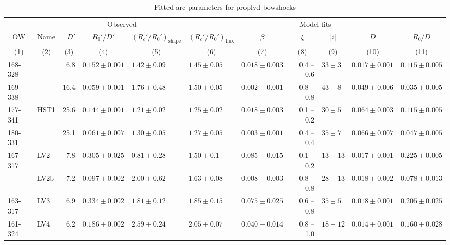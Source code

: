 \begin{table}
  \caption{Fitted arc parameters for proplyd bowshocks}
  \label{tab:arc-fits} 
\newcommand\C[1]{\multicolumn{1}{c}{#1}}
\begin{tabular}{llrllllrlll}\toprule
             &          & \multicolumn{3}{c}{\dotfill Observed \dotfill}              & \multicolumn{6}{c}{\dotfill Model fits \dotfill} \\ 
  \C{OW}     & \C{Name} & \(D'\) &\C{ \(R_0'/D'\) }&\C{ \((R_c'/R_0')_{\mathrm{shape}}\) }&\C{ \((R_c'/R_0')_{\mathrm{flux}}\) }&\C{ \(\beta\) }&\C{ \(\xi\) }&\C{ \(|i|\) }&\C{ \(D\) }&\C{ \(R_0/D\)}\\
  \C{(1)}& \C{ (2) }&\C{ (3)    }&\C{    (4)      }&\C{              (5)           }&\C{           (6)             }&\C{     (7)   }&\C{   (8)   }&\C{   (9) }&\C{  (10) }&\C{   (11)} \\
\midrule     
 168-328  &            &    6.8  &  $0.152 \pm 0.001$  &  $1.42 \pm 0.09$   &  $1.45 \pm 0.05$     &  $0.018 \pm 0.003$  &  0.4 -- 0.6  &  $33 \pm 3$   &  $0.017 \pm 0.001$  &  $0.115 \pm 0.005$  \\
 169-338  &            &  16.4  &  $0.059 \pm 0.001$  &  $1.76 \pm 0.48$   &  $1.50 \pm 0.05$     &  $0.002 \pm 0.001$  &  0.8 -- 0.8  &  $43 \pm 8$   &  $0.049 \pm 0.006$  &  $0.035 \pm 0.005$  \\
 177-341  & HST1   & 25.6  &  $0.144 \pm 0.001$  &  $1.21 \pm 0.02$   &  $1.25 \pm 0.02$     &  $0.018 \pm 0.003$  &  0.1 -- 0.2  &  $30 \pm 5$   &  $0.064 \pm 0.003$  &  $0.115 \pm 0.005$  \\
 180-331  &             &  25.1  &  $0.061 \pm 0.007$  &  $1.30 \pm 0.05$   &  $1.27 \pm 0.05$     &  $0.003 \pm 0.001$  &  0.4 -- 0.4  &  $35 \pm 7$   &  $0.066 \pm 0.007$  &  $0.047 \pm 0.005$  \\
 167-317  &  LV2     &    7.8  &  $0.305 \pm 0.025$  &  $0.81 \pm 0.28$   &  $1.50 \pm 0.1$      &  $0.085 \pm 0.015$  &  0.1 -- 0.2  &  $13 \pm 13$  &  $0.017 \pm 0.001$  &  $0.225 \pm 0.005$  \\
               & LV2b    &   7.2  &  $0.097 \pm 0.002$  &  $2.00 \pm 0.62$   &  $1.63 \pm 0.08$     &  $0.008 \pm 0.003$  &  0.8 -- 0.8  &  $28 \pm 13$  &  $0.018 \pm 0.002$  &  $0.078 \pm 0.013$  \\
 163-317  & LV3      &   6.9  &  $0.334 \pm 0.002$  &  $1.81 \pm 0.12$   &  $1.85 \pm 0.15$     &  $0.075 \pm 0.025$  &  0.6 -- 0.8  &  $35 \pm 5$   &  $0.018 \pm 0.001$  &  $0.205 \pm 0.025$  \\
 161-324  & LV4      &   6.2  &  $0.186 \pm 0.002$  &  $2.59 \pm 0.24$   &  $2.05 \pm 0.07$     &  $0.040 \pm 0.014$  &  0.8 -- 1.0  &  $18 \pm 12$  &  $0.014 \pm 0.001$  &  $0.160 \pm 0.028$  \\

\end{tabular}
\end{table}
